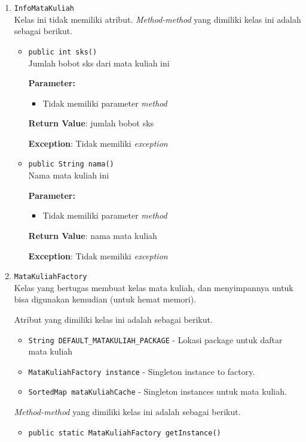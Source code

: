 \documentclass{article}
\begin{document}
\begin{enumerate}
\item \texttt{InfoMataKuliah}\\ 
Kelas ini tidak memiliki atribut. \textit{Method-method} yang dimiliki kelas ini adalah sebagai berikut.
\begin{itemize}
\item \texttt{public int sks()}\\ 
Jumlah bobot sks dari mata kuliah ini

\textbf{Parameter:}\begin{itemize}
\item Tidak memiliki parameter \textit{method}
\end{itemize}
\textbf{Return Value}: jumlah bobot sks

\textbf{Exception}: Tidak memiliki \textit{exception}

\item \texttt{public String nama()}\\ 
Nama mata kuliah ini

\textbf{Parameter:}\begin{itemize}
\item Tidak memiliki parameter \textit{method}
\end{itemize}
\textbf{Return Value}: nama mata kuliah

\textbf{Exception}: Tidak memiliki \textit{exception}

\end{itemize}
\item \texttt{MataKuliahFactory}\\ 
Kelas yang bertugas membuat kelas mata kuliah, dan menyimpannya untuk bisa
 digunakan kemudian (untuk hemat memori).

Atribut yang dimiliki kelas ini adalah sebagai berikut.
\begin{itemize}
\item \texttt{String DEFAULT\_MATAKULIAH\_PACKAGE} - Lokasi package untuk daftar mata kuliah
\item \texttt{MataKuliahFactory instance} - Singleton instance to factory.
\item \texttt{SortedMap mataKuliahCache} - Singleton instances untuk mata kuliah.
\end{itemize}
\textit{Method-method} yang dimiliki kelas ini adalah sebagai berikut.
\begin{itemize}
\item \texttt{public static MataKuliahFactory getInstance()}\\ 



\end{itemize}
\end{enumerate}
\end{document}

